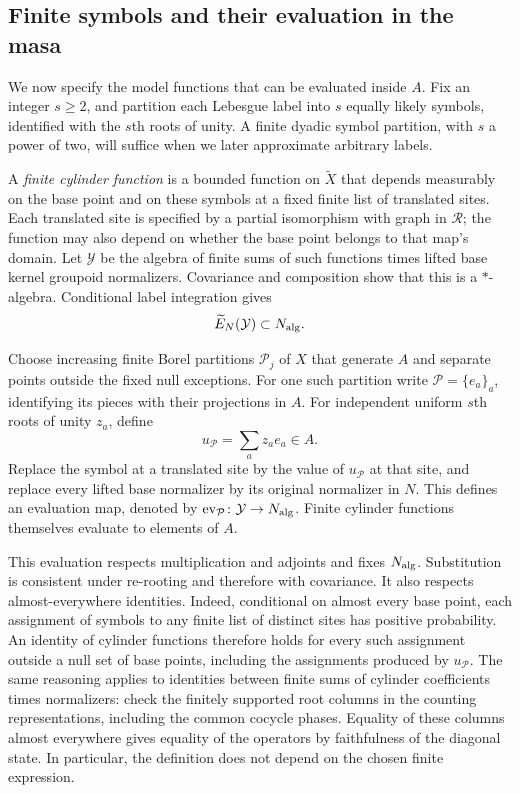 \subsection{Finite symbols and their evaluation in the masa}

We now specify the model functions that can be evaluated inside $A$.
Fix an integer $s\ge2$, and partition each Lebesgue label into $s$
equally likely symbols, identified with the $s$th roots of unity. A
finite dyadic symbol partition, with $s$ a power of two, will suffice
when we later approximate arbitrary labels.

A \emph{finite cylinder function} is a bounded function on
$\widetilde X$ that depends measurably on the base point and on these
symbols at a fixed finite list of translated sites. Each translated
site is specified by a partial isomorphism with graph in $\mathcal R$;
the function may also depend on whether the base point belongs to that
map's domain. Let $\mathcal Y$ be the algebra of finite sums of such
functions times lifted base kernel groupoid normalizers. Covariance
and composition show that this is a $*$-algebra. Conditional label
integration gives
\[
 \widetilde E_N(\mathcal Y)\subset N_{\rm alg}.
\]

Choose increasing finite Borel partitions $\mathcal P_j$ of $X$ that
generate $A$ and separate points outside the fixed null exceptions.
For one such partition write $\mathcal P=\{e_a\}_a$, identifying its
pieces with their projections in $A$. For independent uniform $s$th
roots of unity $z_a$, define
\[
 u_{\mathcal P}=\sum_a z_a e_a\in A.
\]
Replace the symbol at a translated site by the value of
$u_{\mathcal P}$ at that site, and replace every lifted base normalizer
by its original normalizer in $N$. This defines an evaluation map,
denoted by $\mathrm{ev}_{\mathcal P}\colon\mathcal Y\to N_{\rm alg}$.
Finite cylinder functions themselves evaluate to elements of $A$.

This evaluation respects multiplication and adjoints and fixes
$N_{\rm alg}$. Substitution is consistent under re-rooting and therefore
with covariance. It also respects almost-everywhere identities. Indeed,
conditional on almost every base point, each assignment of symbols to
any finite list of distinct sites has positive probability. An identity
of cylinder functions therefore holds for every such assignment outside
a null set of base points, including the assignments produced by
$u_{\mathcal P}$. The same reasoning applies to identities between
finite sums of cylinder coefficients times normalizers: check the
finitely supported root columns in the counting representations,
including the common cocycle phases. Equality of these columns almost
everywhere gives equality of the operators by faithfulness of the
diagonal state. In particular, the definition does not depend on the
chosen finite expression.


